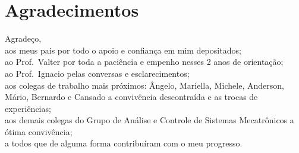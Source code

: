 
\chapter*{Agradecimentos}

\noindent Agradeço,\\[2mm]
aos meus pais por todo o apoio e confiança em mim depositados;\\[2mm]
ao Prof.\ Valter por toda a paciência e empenho nesses 2 anos de orientação;\\[2mm]
ao Prof.\ Ignacio pelas conversas e esclarecimentos;\\[2mm]
aos colegas de trabalho mais próximos: Ângelo, Mariella, Michele, Anderson,
Mário, Bernardo e Cansado a convivência descontraída e as trocas de
experiências;\\[2mm]
aos demais colegas do Grupo de Análise e Controle de Sistemas Mecatrônicos a
ótima convivência;\\[2mm]
a todos que de alguma forma contribuíram com o meu progresso.

\thispagestyle{plain}
\cleardoublepage{}
